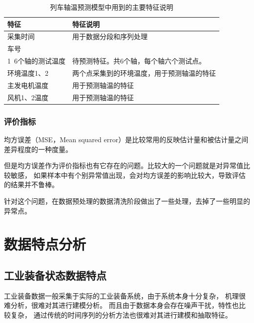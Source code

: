     \begin{table}
      \centering
      \caption{列车轴温预测模型中用到的主要特征说明}
      \begin{tabular}{ll}
        \toprule
        特征       & 特征说明                                       \\
        \midrule
        采集时间      & 用于数据分段和序列处理 \\
        车号          &\\
        1~6个轴的测试温度 & 待预测特征。共6个轴，每个轴六个测试点。 \\
        环境温度1、2  & 两个点采集到的环境温度，用于预测轴温的特征 \\
        主发电机温度  & 用于预测轴温的特征\\
        风机1、2温度  & 用于预测轴温的特征\\
        

        \bottomrule
      \end{tabular}
      \label{tab:features1}
    \end{table}
  \subsubsection{评价指标}
    均方误差（MSE，Mean squared error）是比较常用的反映估计量和被估计量之间差异程度的一种度量。
  
    但是均方误差作为评价指标也有它存在的问题。比较大的一个问题就是对异常值比较敏感，
    如果样本中有个别异常值出现，会对均方误差的影响比较大，导致评估的结果并不鲁棒。
  
    针对这个问题，在数据预处理的数据清洗阶段做出了一些处理，去掉了一些明显的异常点。

\section{数据特点分析}
  \subsection{工业装备状态数据特点}
  工业装备数据一般采集于实际的工业装备系统，由于系统本身十分复杂，
  机理很难分析，很难对其进行建模分析。
  而且由于数据本身会存在噪声干扰，特性也比较复杂，
  通过传统的时间序列的分析方法也很难对其进行建模和抽取特征。
  
